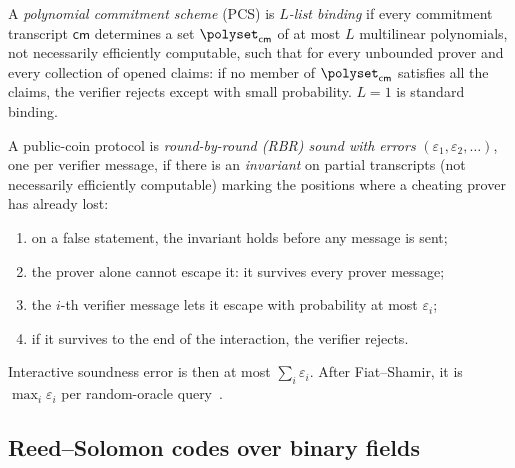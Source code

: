 \begin{definition}\label{def:listbinding}
A \emph{polynomial commitment scheme} (PCS) is \emph{$L$-list binding} if every commitment transcript $\mathsf{cm}$ determines a set $\polyset_{\mathsf{cm}}$ of at most $L$ multilinear polynomials, not necessarily efficiently computable, such that for every unbounded prover and every collection of opened claims: if no member of $\polyset_{\mathsf{cm}}$ satisfies all the claims, the verifier rejects except with small probability. $L = 1$ is standard binding.
\end{definition}

\begin{definition}\label{def:rbr}
A public-coin protocol is \emph{round-by-round (RBR) sound with errors} $(\varepsilon_1, \varepsilon_2, \dots)$, one per verifier message, if there is an \emph{invariant} on partial transcripts (not necessarily efficiently computable) marking the positions where a cheating prover has already lost:
\begin{enumerate}[itemsep=1pt,label=(\roman*)]
\item on a false statement, the invariant holds before any message is sent;
\item the prover alone cannot escape it: it survives every prover message;
\item the $i$-th verifier message lets it escape with probability at most $\varepsilon_i$;
\item if it survives to the end of the interaction, the verifier rejects.
\end{enumerate}
\end{definition}

Interactive soundness error is then at most $\sum_i \varepsilon_i$. After Fiat--Shamir, it is $\max_i \varepsilon_i$ per random-oracle query~\cite{CCHLRR19,BCS16}.

\subsection{Reed--Solomon codes over binary fields}\label{sec:binary-rs}

